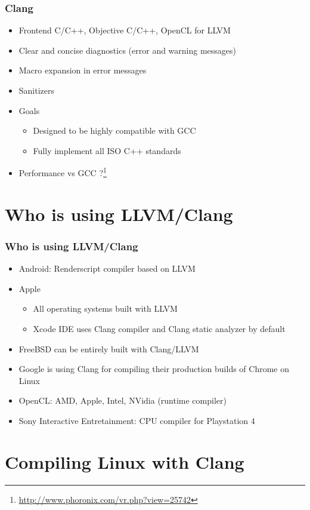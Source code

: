 \documentclass{beamer}
\begin{document}
\begin{frame}
\frametitle{Clang}
\begin{itemize}
  \item Frontend C/C++, Objective C/C++, OpenCL for LLVM
  \item Clear and concise diagnostics (error and warning messages)
  \item Macro expansion in error messages
  \item Sanitizers
  \item Goals
  \begin{itemize}
    \item Designed to be highly compatible with GCC
    \item Fully implement all ISO C++ standards
  \end{itemize}
  \item Performance vs GCC ?\footnote{\url{http://www.phoronix.com/vr.php?view=25742}}
\end{itemize}

\end{frame}
\section{Who is using LLVM/Clang}

\begin{frame}
\frametitle{Who is using LLVM/Clang}
\begin{itemize}
  \item Android: Renderscript compiler based on LLVM
  \item Apple
  \begin{itemize}
    \item All operating systems built with LLVM
    \item Xcode IDE uses Clang compiler and Clang static analyzer by default
  \end{itemize}
  \item FreeBSD can be entirely built with Clang/LLVM
  \item Google is using Clang for compiling their production builds of Chrome on Linux
  \item OpenCL: AMD, Apple, Intel, NVidia (runtime compiler)
  \item Sony Interactive Entretainment: CPU compiler for Playstation 4
\end{itemize}
\end{frame}
\section{Compiling Linux with Clang}
\end{document}

